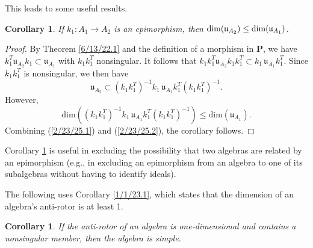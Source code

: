 \documentclass{amsart}
\numberwithin{equation}{section}
\newtheorem{corollary}[theorem]{Corollary}
\theoremstyle{definition}
\numberwithin{theorem}{section}
\begin{document}
This leads to some useful results.  \enlargethispage{1cm}

\begin{corollary} \label{8/17/22.5} If $k_1:A_1\rightarrow A_2$ is an epimorphism, then ${\rm dim}(\mathfrak{u}_{A_2}) \le {\rm dim}(\mathfrak{u}_{A_1})$. \end{corollary}  

\begin{proof} By Theorem \ref{6/13/22.1} and the definition of a morphism in $\mathbf{P}$, we have \mbox{$k_1^T \mathfrak{u}_{A_2} k_1 \subset \mathfrak{u}_{A_1}$} with $k_1k_1^T$ nonsingular.  It follows that  $k_1k_1^T \mathfrak{u}_{A_2} k_1k_1^T \subset k_1\,\mathfrak{u}_{A_1}k_1^T$.  Since $k_1k_1^T$ is nonsingular, we then have 
\begin{equation}\label{2/23/25.1} \mathfrak{u}_{A_2} \subset (k_1k_1^T)^{-1}k_1\, \mathfrak{u}_{A_1} k_1^T(k_1k_1^T)^{-1}.\end{equation}  However, \begin{equation}\label{2/23/25.2}  \text{dim}\left((k_1k_1^T)^{-1}k_1 \,\mathfrak{u}_{A_1} k_1^T(k_1k_1^T)^{-1}\right) \le \text{dim}(\mathfrak{u}_{A_1}).\end{equation} Combining (\ref{2/23/25.1}) and (\ref{2/23/25.2}), the corollary follows.
   \end{proof}
   
  Corollary \ref{8/17/22.5} is useful in excluding the possibility that two algebras are related by an epimorphism (e.g., in excluding an epimorphism from an algebra to one of its subalgebras without having to identify ideals).

The following uses Corollary \ref{1/1/23.1}, which states that the dimension of an algebra's anti-rotor is at least 1. 

\begin{corollary}\label{8/17/22.1} If the anti-rotor of an algebra is one-dimensional and contains a nonsingular member, then the algebra is simple. \end{corollary}
\end{document}
